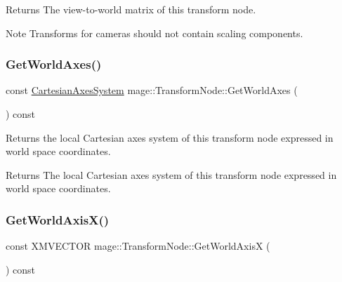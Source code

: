\begin{DoxyReturn}{Returns}
The view-\/to-\/world matrix of this transform node. 
\end{DoxyReturn}
\begin{DoxyNote}{Note}
Transforms for cameras should not contain scaling components. 
\end{DoxyNote}
\hypertarget{structmage_1_1_transform_node_aca4f35bb8aaffabc8c825133a7a307e9}{}\label{structmage_1_1_transform_node_aca4f35bb8aaffabc8c825133a7a307e9} 
\subsubsection{\texorpdfstring{Get\+World\+Axes()}{GetWorldAxes()}}
{\footnotesize\ttfamily const \hyperlink{structmage_1_1_cartesian_axes_system}{Cartesian\+Axes\+System} mage\+::\+Transform\+Node\+::\+Get\+World\+Axes (\begin{DoxyParamCaption}{ }\end{DoxyParamCaption}) const\hspace{0.3cm}{\ttfamily [noexcept]}}

Returns the local Cartesian axes system of this transform node expressed in world space coordinates.

\begin{DoxyReturn}{Returns}
The local Cartesian axes system of this transform node expressed in world space coordinates. 
\end{DoxyReturn}
\hypertarget{structmage_1_1_transform_node_a14a5604bcaa467c748f543092037ace6}{}\label{structmage_1_1_transform_node_a14a5604bcaa467c748f543092037ace6} 
\subsubsection{\texorpdfstring{Get\+World\+Axis\+X()}{GetWorldAxisX()}}
{\footnotesize\ttfamily const X\+M\+V\+E\+C\+T\+OR mage\+::\+Transform\+Node\+::\+Get\+World\+AxisX (\begin{DoxyParamCaption}{ }\end{DoxyParamCaption}) const\hspace{0.3cm}{\ttfamily [noexcept]}}

